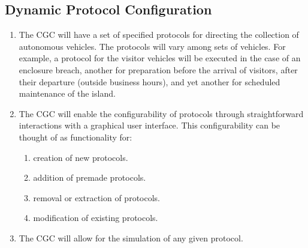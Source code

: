 \documentclass[12pt]{article}
\begin{document}
	\subsection{Dynamic Protocol Configuration}
	\begin{enumerate}
		\item The CGC will have a set of specified protocols for directing the collection 
		of autonomous vehicles. The protocols will vary among sets of vehicles. For example, 
		a protocol for the visitor vehicles will be executed in the case of an enclosure 
		breach, another for preparation before the arrival of visitors, after their departure 
		(outside business hours), and yet another for scheduled maintenance of the island.
		\item The CGC will enable the configurability of protocols through straightforward 
		interactions with a graphical user interface. This configurability can be thought of
		as functionality for:
		\begin{enumerate}
			\item creation of new protocols.
			\item addition of premade protocols.
			\item removal or extraction of protocols.
			\item modification of existing protocols.
		\end{enumerate}
		\item The CGC will allow for the simulation of any given protocol.
	\end{enumerate}
	
\end{document}
